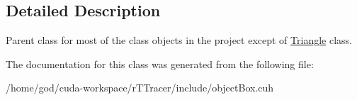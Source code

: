 \subsection{Detailed Description}
Parent class for most of the class objects in the project except of \hyperlink{class_triangle}{Triangle} class. 

The documentation for this class was generated from the following file\+:\begin{DoxyCompactItemize}
\item 
/home/god/cuda-\/workspace/r\+T\+Tracer/include/object\+Box.\+cuh\end{DoxyCompactItemize}
